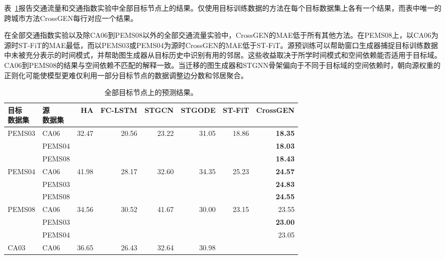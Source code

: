 \documentclass[runningheads,a4paper]{llncs}
\begin{document}
\begin{CJK*}{UTF8}{gbsn}
表~\ref{tab:main-results}报告交通流量和交通指数实验中全部目标节点上的结果。仅使用目标训练数据的方法在每个目标数据集上各有一个结果，而表中唯一的跨城市方法CrossGEN每行对应一个结果。

在全部交通指数实验以及除CA06到PEMS08以外的全部交通流量实验中，CrossGEN的MAE低于所有其他方法。在PEMS08上，以CA06为源时ST-FiT的MAE最低，而以PEMS03或PEMS04为源时CrossGEN的MAE低于ST-FiT。源预训练可以帮助窗口生成器捕捉目标训练数据中未被充分表示的时间模式，并帮助图生成器从目标历史中识别有用的邻居。这些收益取决于所学时间模式和空间依赖能否适用于目标域。CA06到PEMS08的结果与空间依赖不匹配的解释一致。当迁移的图生成器和STGNN骨架偏向于不同于目标域的空间依赖时，朝向源权重的正则化可能使模型更难仅利用一部分目标节点的数据调整边分数和邻居聚合。

\begin{table}[t]
\centering
\caption{全部目标节点上的预测结果。}
\label{tab:main-results}
\footnotesize
\setlength{\tabcolsep}{2.2pt}
\begin{tabular}{@{}llrrrr@{\hspace{9pt}}rr@{}}
\hline
\shortstack[l]{目标\\数据集} & \shortstack[l]{源\\数据集} &
HA & FC-LSTM & STGCN & STGODE & ST-FiT & CrossGEN \\
\hline
\multirow{3}{*}{PEMS03} & CA06 &
  \multirow{3}{*}{32.47} & \multirow{3}{*}{20.56} &
  \multirow{3}{*}{23.22} & \multirow{3}{*}{31.05} &
  \multirow{3}{*}{18.86} & \textbf{18.35} \\
 & PEMS04 & & & & & & \textbf{18.03} \\
 & PEMS08 & & & & & & \textbf{18.43} \\[3pt]
\multirow{3}{*}{PEMS04} & CA06 &
  \multirow{3}{*}{41.98} & \multirow{3}{*}{28.17} &
  \multirow{3}{*}{32.60} & \multirow{3}{*}{34.35} &
  \multirow{3}{*}{25.23} & \textbf{24.57} \\
 & PEMS03 & & & & & & \textbf{24.83} \\
 & PEMS08 & & & & & & \textbf{24.55} \\[3pt]
\multirow{3}{*}{PEMS08} & CA06 &
  \multirow{3}{*}{34.56} & \multirow{3}{*}{30.52} &
  \multirow{3}{*}{41.67} & \multirow{3}{*}{30.00} &
  \multirow{3}{*}{23.15} & 23.55 \\
 & PEMS03 & & & & & & \textbf{23.00} \\
 & PEMS04 & & & & & & 23.05 \\[3pt]
\multirow{2}{*}{CA03} & CA06 &
  \multirow{2}{*}{36.65} & \multirow{2}{*}{26.43} &
  \multirow{2}{*}{32.64} & \multirow{2}{*}{30.98} &

\end{tabular}
\end{table}
\end{CJK*}
\end{document}
